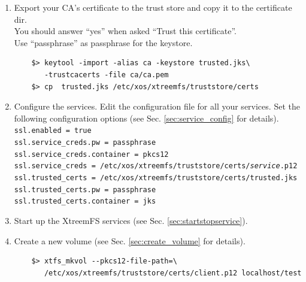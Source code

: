 \documentclass[a4paper,10pt]{book}
\begin{document}
\begin{enumerate}
\begin{enumerate}
	\item Export the service credentials (certificate and private key) as a PKCS\#12 file.\\
		Use ``passphrase'' as export password. You can leave the export password empty for the XtreemFS Client to avoid being asked for the password on mount.
		\begin{Verbatim}[commandchars=\\\{\}]
$> openssl pkcs12 -export -in \textit{service}.pem -inkey \
   \textit{service}.key \
   -out \textit{service}.p12 -name "\textit{service}"
		\end{Verbatim}

	\item Copy the PKCS\#12 file to the certificates directory.
		\begin{Verbatim}[commandchars=\\\{\}]
	$> mkdir -p /etc/xos/xtreemfs/truststore/certs
    $> cp \textit{service}.p12 /etc/xos/xtreemfs/truststore/certs
		\end{Verbatim}

	\end{enumerate}
 \item Export your CA's certificate to the trust store and copy it to the certificate dir.\\
	You should answer ``yes'' when asked ``Trust this certificate''.\\
	Use ``passphrase'' as passphrase for the keystore.
	\begin{verbatim}
	$> keytool -import -alias ca -keystore trusted.jks\
	   -trustcacerts -file ca/ca.pem
	$> cp  trusted.jks /etc/xos/xtreemfs/truststore/certs
	\end{verbatim}

 \item Configure the services.
	Edit the configuration file for all your services. Set the following configuration options (see Sec. \ref{sec:service_config} for details).\\
	\texttt{ssl.enabled = true}\\
	\texttt{ssl.service\_creds.pw = passphrase}\\
	\texttt{ssl.service\_creds.container = pkcs12}\\
	\texttt{ssl.service\_creds = /etc/xos/xtreemfs/truststore/certs/\textit{service}.p12}\\
	\texttt{ssl.trusted\_certs = /etc/xos/xtreemfs/truststore/certs/trusted.jks}\\
	\texttt{ssl.trusted\_certs.pw = passphrase}\\
	\texttt{ssl.trusted\_certs.container = jks}
 \item Start up the XtreemFS services (see Sec. \ref{sec:startstopservice}).
 \item Create a new volume (see Sec. \ref{sec:create_volume} for details).
	\begin{verbatim}
	$> xtfs_mkvol --pkcs12-file-path=\
	   /etc/xos/xtreemfs/truststore/certs/client.p12 localhost/test
	\end{verbatim}


\end{enumerate}
\end{document}
